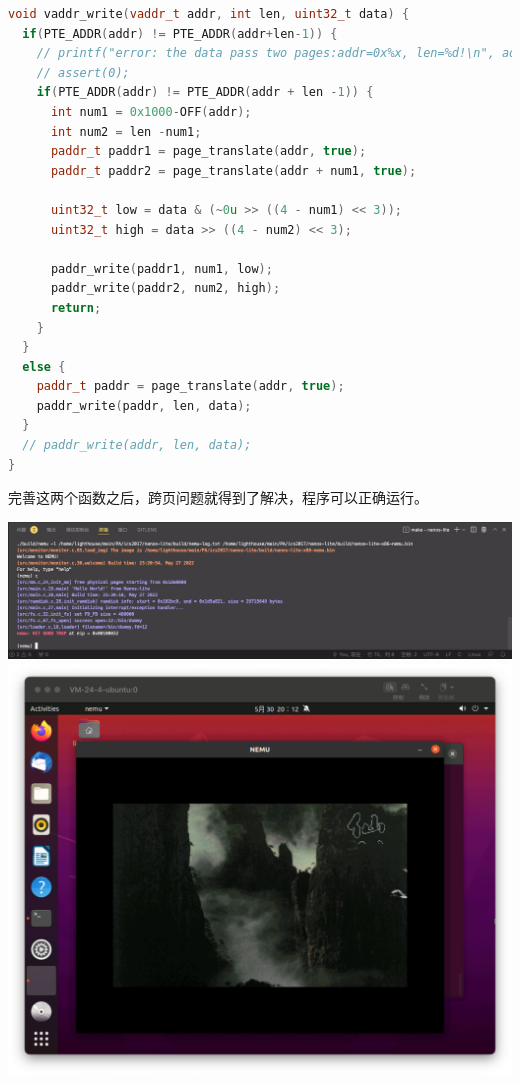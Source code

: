 \documentclass[UTF8,a4paper,10pt]{ctexart}
\begin{document}
\begin{lstlisting}[language = C++]
void vaddr_write(vaddr_t addr, int len, uint32_t data) {
  if(PTE_ADDR(addr) != PTE_ADDR(addr+len-1)) {
    // printf("error: the data pass two pages:addr=0x%x, len=%d!\n", addr, len);
    // assert(0);
    if(PTE_ADDR(addr) != PTE_ADDR(addr + len -1)) {
      int num1 = 0x1000-OFF(addr);
      int num2 = len -num1;
      paddr_t paddr1 = page_translate(addr, true);
      paddr_t paddr2 = page_translate(addr + num1, true);

      uint32_t low = data & (~0u >> ((4 - num1) << 3));
      uint32_t high = data >> ((4 - num2) << 3);

      paddr_write(paddr1, num1, low);
      paddr_write(paddr2, num2, high);
      return;
    }
  }
  else {
    paddr_t paddr = page_translate(addr, true);
    paddr_write(paddr, len, data);
  }
  // paddr_write(addr, len, data);
}
\end{lstlisting}
完善这两个函数之后，跨页问题就得到了解决，程序可以正确运行。
\begin{center}
  \includegraphics*[scale = 0.28]{img/7}
  \includegraphics*[scale = 0.32]{img/8}
\end{center}
\end{document}
